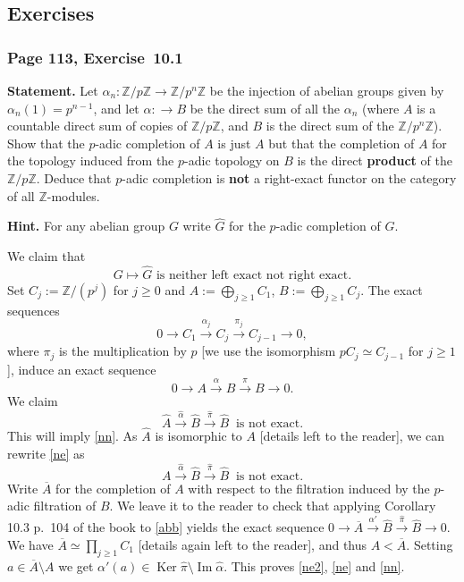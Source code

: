 \documentclass[12pt,letterpaper]{article}%
\newcommand{\oo}{\operatorname}\newcommand{\ooo}{\operatorname*}
\newcommand{\xr}{\xrightarrow}
\newcommand{\nn}{\noindent}
\newcommand{\Z}{\mathbb Z}
\begin{document}
\subsection{Exercises}%

\subsubsection{Page 113, Exercise~10.1}%

\textbf{Statement.} Let $\alpha_n:\Z/p\Z\to\Z/p^n\Z$ be the injection of abelian groups given by $\alpha_n(1)=p^{n-1}$, and let $\alpha:\to B$ be the direct sum of all the $\alpha_n$ (where $A$ is a countable direct sum of copies of $\Z/p\Z$, and $B$ is the direct sum of the $\Z/p^n\Z$). Show that the $p$-adic completion of $A$ is just $A$ but that the completion of $A$ for the topology induced from the $p$-adic topology on $B$ is the direct \textbf{product} of the $\Z/p\Z$. Deduce that $p$-adic completion is \textbf{not} a right-exact functor on the category of all $\Z$-modules.

\nn\textbf{Hint.} For any abelian group $G$ write $\widehat G$ for the $p$-adic completion of $G$. 

We claim that 
\begin{equation}\label{nn}
G\mapsto\widehat G\text{ is neither left exact not right exact.}
\end{equation}
Set $C_j:=\mathbb Z/(p^j)$ for $j\ge0$ and $A:=\bigoplus_{j\ge1}C_1$, $B:=\bigoplus_{j\ge1}C_j$. The exact sequences 
$$
0\to C_1\xr{\alpha_j}C_j\xr{\pi_j}C_{j-1}\to0,
$$ 
where $\pi_j$ is the multiplication by $p$ [we use the isomorphism $pC_j\simeq C_{j-1}$ for $j\ge1$], induce an exact sequence 
\begin{equation}\label{abb}
0\to A\xr{\alpha}B\xr{\pi}B\to0.
\end{equation} 
We claim 
\begin{equation}\label{ne}
\widehat A\xr{\widehat\alpha}\widehat B\xr{\widehat\pi}\widehat B\ \text{ is not exact.}
\end{equation} 
This will imply \eqref{nn}. As $\widehat A$ is isomorphic to $A$ [details left to the reader], we can rewrite \eqref{ne} as  
\begin{equation}\label{ne2}
A\xr{\widehat\alpha}\widehat B\xr{\widehat\pi}\widehat B\ \text{ is not exact.}
\end{equation} 
Write $\overline A$ for the completion of $A$ with respect to the filtration induced by the $p$-adic filtration of $B$. We leave it to the reader to check that applying Corollary 10.3 p.~104 of the book to \eqref{abb} yields the exact sequence $0\to\overline A\xr{\alpha'}\widehat B\xr{\widehat\pi}\widehat B\to0$. We have $\overline A\simeq\prod_{j\ge1}C_1$ [details again left to the reader], and thus $A<\overline A$. Setting $a\in\overline A\setminus A$ we get $\alpha'(a)\in\oo{Ker}\widehat\pi\setminus\oo{Im}\widehat\alpha$. This proves \eqref{ne2}, \eqref{ne} and \eqref{nn}.
\end{document}
